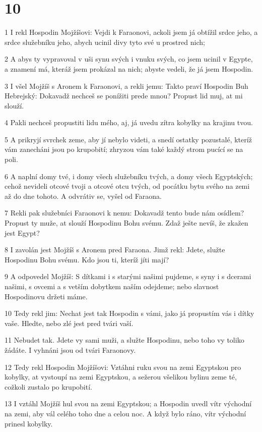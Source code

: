 \chapter{10}

\par 1 I rekl Hospodin Mojžíšovi: Vejdi k Faraonovi, ackoli jsem já obtížil srdce jeho, a srdce služebníku jeho, abych ucinil divy tyto své u prostred nich;
\par 2 A abys ty vypravoval v uši synu svých i vnuku svých, co jsem ucinil v Egypte, a znamení má, kteráž jsem prokázal na nich; abyste vedeli, že já jsem Hospodin.
\par 3 I všel Mojžíš s Aronem k Faraonovi, a rekli jemu: Takto praví Hospodin Buh Hebrejský: Dokavadž nechceš se ponížiti prede mnou? Propust lid muj, at mi slouží.
\par 4 Pakli nechceš propustiti lidu mého, aj, já uvedu zítra kobylky na krajinu tvou.
\par 5 A prikryjí svrchek zeme, aby jí nebylo videti, a snedí ostatky pozustalé, kteríž vám zanecháni jsou po krupobití; zhryzou vám také každý strom pucící se na poli.
\par 6 A naplní domy tvé, i domy všech služebníku tvých, a domy všech Egyptských; cehož nevideli otcové tvoji a otcové otcu tvých, od pocátku bytu svého na zemi až do dne tohoto. A odvrátiv se, vyšel od Faraona.
\par 7 Rekli pak služebníci Faraonovi k nemu: Dokavadž tento bude nám osídlem? Propust ty muže, at slouží Hospodinu Bohu svému. Zdaž ješte nevíš, že zkažen jest Egypt?
\par 8 I zavolán jest Mojžíš s Aronem pred Faraona. Jimž rekl: Jdete, služte Hospodinu Bohu svému. Kdo jsou ti, kteríž jíti mají?
\par 9 A odpovedel Mojžíš: S dítkami i s starými našimi pujdeme, s syny i s dcerami našimi, s ovcemi a s vetším dobytkem naším odejdeme; nebo slavnost Hospodinovu držeti máme.
\par 10 Tedy rekl jim: Nechat jest tak Hospodin s vámi, jako já propustím vás i dítky vaše. Hledte, nebo zlé jest pred tvári vaší.
\par 11 Nebudet tak. Jdete vy sami muži, a služte Hospodinu, nebo toho vy toliko žádáte. I vyhnáni jsou od tvári Faraonovy.
\par 12 Tedy rekl Hospodin Mojžíšovi: Vztáhni ruku svou na zemi Egyptskou pro kobylky, at vystoupí na zemi Egyptskou, a sežerou všelikou bylinu zeme té, cožkoli zustalo po krupobití.
\par 13 I vztáhl Mojžíš hul svou na zemi Egyptskou; a Hospodin uvedl vítr východní na zemi, aby vál celého toho dne a celou noc. A když bylo ráno, vítr východní prinesl kobylky.
